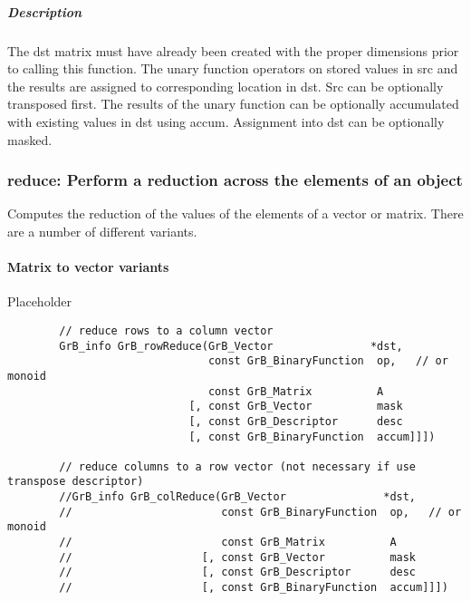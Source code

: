 \subparagraph{Description}

The dst matrix must have already been created with the proper dimensions
prior to calling this function.  The unary function operators on stored values in src and the results are assigned to corresponding location in dst.
Src can be optionally transposed first.  The results of the unary function can be optionally accumulated with existing values in dst using accum.  Assignment into dst can be optionally masked.


\subsubsection{{\sf reduce}: Perform a reduction across the elements of an object}

Computes the reduction of the values of the elements of a vector or matrix.  There are a number of different variants.

\paragraph{Matrix to vector variants}

Placeholder


\begin{verbatim}
        // reduce rows to a column vector
        GrB_info GrB_rowReduce(GrB_Vector               *dst,
                               const GrB_BinaryFunction  op,   // or monoid
                               const GrB_Matrix          A
                            [, const GrB_Vector          mask
                            [, const GrB_Descriptor      desc
                            [, const GrB_BinaryFunction  accum]]])
                               
        // reduce columns to a row vector (not necessary if use transpose descriptor)
        //GrB_info GrB_colReduce(GrB_Vector               *dst,
        //                       const GrB_BinaryFunction  op,   // or monoid
        //                       const GrB_Matrix          A
        //                    [, const GrB_Vector          mask
        //                    [, const GrB_Descriptor      desc
        //                    [, const GrB_BinaryFunction  accum]]])
\end{verbatim}

